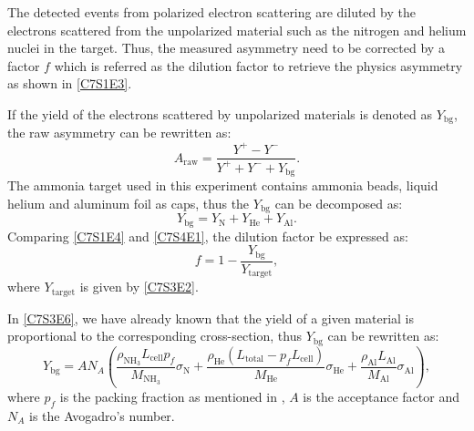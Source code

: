 The detected events from polarized electron scattering are diluted by the electrons scattered from the unpolarized material such as the nitrogen and helium nuclei in the target. Thus, the measured asymmetry need to be corrected by a factor $f$ which is referred as the dilution factor to retrieve the physics asymmetry as shown in \cref{C7S1E3}.

If the yield of the electrons scattered by unpolarized materials is denoted as $Y_{\mathrm{bg}}$, the raw asymmetry can be rewritten as:
\begin{equation} \label{C7S4E1}
A_{\mathrm{raw}} = \frac{Y^+-Y^-}{Y^++Y^-+Y_{\mathrm{bg}}}.
\end{equation}
The ammonia target used in this experiment contains ammonia beads, liquid helium and aluminum foil as caps, thus the $Y_{\mathrm{bg}}$ can be decomposed as:
\begin{equation} \label{C7S4E2}
Y_{\mathrm{bg}} = Y_{\mathrm{N}}+Y_{\mathrm{He}}+Y_{\mathrm{Al}}.
\end{equation}
Comparing \cref{C7S1E4} and \cref{C7S4E1}, the dilution factor be expressed as:
\begin{equation} \label{C7S4E3}
f = 1-\frac{Y_{\mathrm{bg}}}{Y_{\mathrm{target}}},
\end{equation}
where $Y_{\mathrm{target}}$ is given by \cref{C7S3E2}.

In \cref{C7S3E6}, we have already known that the yield of a given material is proportional to the corresponding cross-section, thus $Y_{\mathrm{bg}}$ can be rewritten as:
\begin{equation} \label{C7S4E4}
Y_{\mathrm{bg}} = AN_A\left(\frac{\rho_{\mathrm{NH_3}}L_{\mathrm{cell}}p_f}{M_{\mathrm{NH_3}}}\sigma_{\mathrm{N}}+\frac{\rho_{\mathrm{He}}(L_{\mathrm{total}}-p_fL_{\mathrm{cell}})}{M_{\mathrm{He}}}\sigma_{\mathrm{He}}+\frac{\rho_{\mathrm{Al}}L_{\mathrm{Al}}}{M_{\mathrm{Al}}}\sigma_{\mathrm{Al}}\right),
\end{equation}
where $p_f$ is the packing fraction as mentioned in , $A$ is the acceptance factor and $N_A$ is the Avogadro's number.


